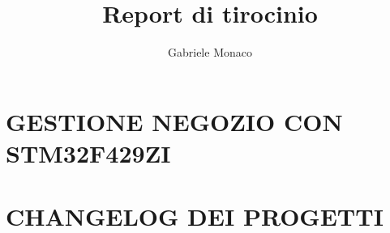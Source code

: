 \documentclass{article}
\title{Report di tirocinio}
\author{Gabriele Monaco}
\begin{document}
\maketitle

\newpage

\tableofcontents

\setlength{\parindent}{0pt}

\newpage
\section{GESTIONE NEGOZIO CON STM32F429ZI}


\newpage
\section{CHANGELOG DEI PROGETTI}

\end{document}
